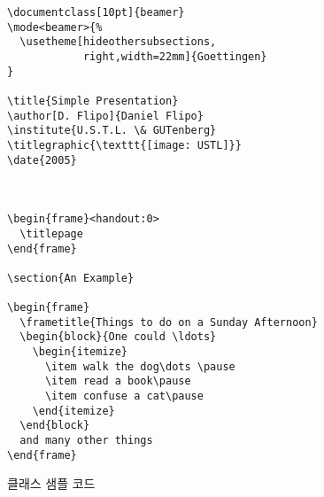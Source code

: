 

% 

\begin{figure}[htbp]
\begin{verbatim}
\documentclass[10pt]{beamer}
\mode<beamer>{%
  \usetheme[hideothersubsections,
            right,width=22mm]{Goettingen}
}

\title{Simple Presentation}
\author[D. Flipo]{Daniel Flipo}
\institute{U.S.T.L. \& GUTenberg}
\titlegraphic{\texttt{[image: USTL]}}
\date{2005}



\begin{frame}<handout:0>
  \titlepage
\end{frame}

\section{An Example}

\begin{frame}
  \frametitle{Things to do on a Sunday Afternoon}
  \begin{block}{One could \ldots}
    \begin{itemize}
      \item walk the dog\dots \pause
      \item read a book\pause
      \item confuse a cat\pause
    \end{itemize}
  \end{block}
  and many other things
\end{frame}

\end{verbatim}
  \caption{ 클래스 샘플 코드}
  \label{fig:code-beamer}
\end{figure}

